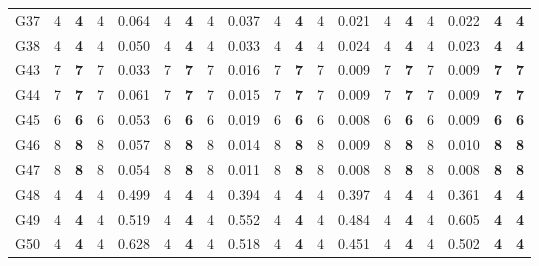\documentclass[12pt, a4paper]{article}%
\numberwithin{equation}{section}
\theoremstyle{plain}
\begin{document}
{\begin{landscape}
\begin{longtable}{lllllllllllllllllll}
						G37                       & 4    & \textbf{4}  & 4   & 0.064 & 4    & \textbf{4}  & 4   & 0.037 & 4    & \textbf{4}  & 4   & 0.021 & 4    & \textbf{4}  & 4   & 0.022 & \textbf{4}              & \textbf{4}           \\
						G38                       & 4    & \textbf{4}  & 4   & 0.050 & 4    & \textbf{4}  & 4   & 0.033 & 4    & \textbf{4}  & 4   & 0.024 & 4    & \textbf{4}  & 4   & 0.023 & \textbf{4}              & \textbf{4}           \\
						G43                       & 7    & \textbf{7}  & 7   & 0.033 & 7    & \textbf{7}  & 7   & 0.016 & 7    & \textbf{7}  & 7   & 0.009 & 7    & \textbf{7}  & 7   & 0.009 & \textbf{7}              & \textbf{7}           \\
						G44                       & 7    & \textbf{7}  & 7   & 0.061 & 7    & \textbf{7}  & 7   & 0.015 & 7    & \textbf{7}  & 7   & 0.009 & 7    & \textbf{7}  & 7   & 0.009 & \textbf{7}              & \textbf{7}           \\
						G45                       & 6    & \textbf{6}  & 6   & 0.053 & 6    & \textbf{6}  & 6   & 0.019 & 6    & \textbf{6}  & 6   & 0.008 & 6    & \textbf{6}  & 6   & 0.009 & \textbf{6}              & \textbf{6}           \\
						G46                       & 8    & \textbf{8}  & 8   & 0.057 & 8    & \textbf{8}  & 8   & 0.014 & 8    & \textbf{8}  & 8   & 0.009 & 8    & \textbf{8}  & 8   & 0.010 & \textbf{8}              & \textbf{8}           \\
						G47                       & 8    & \textbf{8}  & 8   & 0.054 & 8    & \textbf{8}  & 8   & 0.011 & 8    & \textbf{8}  & 8   & 0.008 & 8    & \textbf{8}  & 8   & 0.008 & \textbf{8}              & \textbf{8}           \\
						G48                       & 4    & \textbf{4}  & 4   & 0.499 & 4    & \textbf{4}  & 4   & 0.394 & 4    & \textbf{4}  & 4   & 0.397 & 4    & \textbf{4}  & 4   & 0.361 & \textbf{4}              & \textbf{4}           \\
						G49                       & 4    & \textbf{4}  & 4   & 0.519 & 4    & \textbf{4}  & 4   & 0.552 & 4    & \textbf{4}  & 4   & 0.484 & 4    & \textbf{4}  & 4   & 0.605 & \textbf{4}              & \textbf{4}           \\
						G50                       & 4    & \textbf{4}  & 4   & 0.628 & 4    & \textbf{4}  & 4   & 0.518 & 4    & \textbf{4}  & 4   & 0.451 & 4    & \textbf{4}  & 4   & 0.502 & \textbf{4}              & \textbf{4}           \\

\end{longtable}
\end{landscape}}
\end{document}
